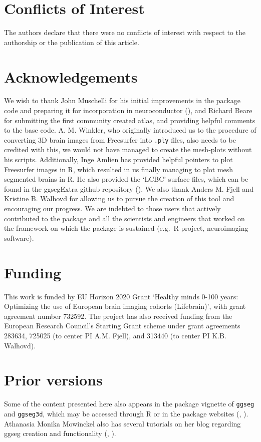\documentclass[fleqn,10pt]{wlpeerj} %
\begin{document}
\hypertarget{conflicts-of-interest}{%
\section{Conflicts of Interest}\label{conflicts-of-interest}}

The authors declare that there were no conflicts of interest with respect to the authorship or the publication of this article.

\hypertarget{acknowledgements}{%
\section{Acknowledgements}\label{acknowledgements}}

We wish to thank John Muschelli for his initial improvements in the package code and preparing it for incorporation in neuroconductor (\citeyearpar{neuroconductor}), and Richard Beare for submitting the first community created atlas, and providing helpful comments to the base code.
A. M. Winkler, who originally introduced us to the procedure of converting 3D brain images from Freesurfer into \texttt{.ply} files, also needs to be credited with this, we would not have managed to create the mesh-plots without his scripts.
Additionally, Inge Amlien has provided helpful pointers to plot Freesurfer images in R, which resulted in us finally managing to plot mesh segmented brains in R.
He also provided the `LCBC' surface files, which can be found in the ggsegExtra github repository (\citet{ggsegExt12_lcbc}).
We also thank Anders M. Fjell and Kristine B. Walhovd for allowing us to pursue the creation of this tool and encouraging our progress.
We are indebted to those users that actively contributed to the package and all the scientists and engineers that worked on the framework on which the package is sustained (e.g.~R-project, neuroimaging software).

\hypertarget{funding}{%
\section{Funding}\label{funding}}

This work is funded by EU Horizon 2020 Grant `Healthy minds 0-100 years: Optimizing the use of European brain imaging cohorts (Lifebrain)', with grant agreement number 732592.
The project has also received funding from the European Research Council's Starting Grant scheme under grant agreements 283634, 725025 (to center PI A.M. Fjell), and 313440 (to center PI K.B. Walhovd).

\hypertarget{prior-versions}{%
\section{Prior versions}\label{prior-versions}}

Some of the content presented here also appears in the package vignette of \texttt{ggseg} and \texttt{ggseg3d}, which may be accessed through R or in the package websites (\citet{ggseg}, \citet{ggseg3d}).
Athanasia Monika Mowinckel also has several tutorials on her blog regarding ggseg creation and functionality (\citet{ggsegAnim}, \citet{ggsegIntro}).

\renewcommand\refname{References}

\end{document}
